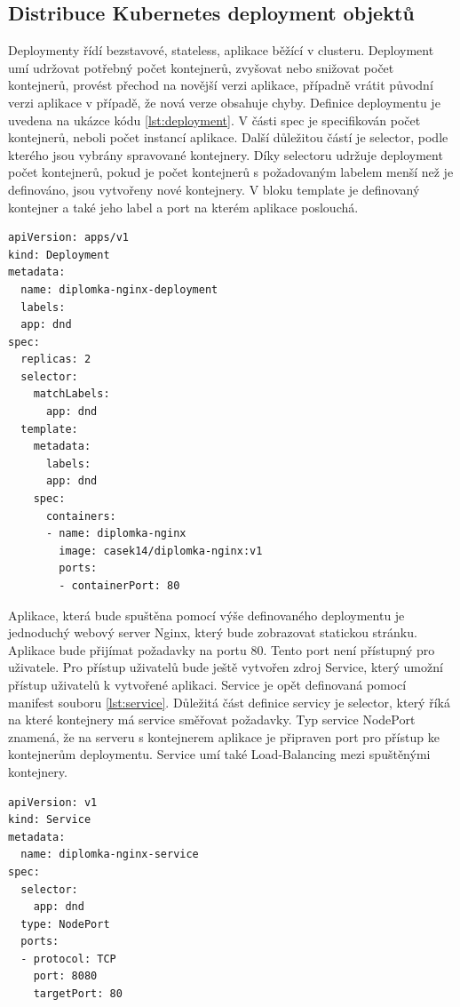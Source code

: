 \subsection{Distribuce Kubernetes deployment objektů}
Deploymenty řídí bezstavové, stateless, aplikace běžící v clusteru. Deployment umí udržovat potřebný počet kontejnerů, zvyšovat nebo snižovat počet kontejnerů, provést přechod na novější verzi aplikace, případně vrátit původní verzi aplikace v případě, že nová verze obsahuje chyby. Definice deploymentu je uvedena na ukázce kódu \ref{lst:deployment}. \linebreak V části spec je specifikován počet kontejnerů, neboli počet instancí aplikace. Další důležitou částí je selector, podle kterého jsou vybrány spravované kontejnery. Díky \linebreak selectoru udržuje deployment počet kontejnerů, pokud je počet kontejnerů s \linebreak požadovaným labelem menší než je definováno, jsou vytvořeny nové kontejnery. \linebreak V bloku template je definovaný kontejner a také jeho label a port na kterém aplikace poslouchá.
\begin{lstlisting}[caption={deployment.yml, definice deploymentu},label=lst:deployment]
apiVersion: apps/v1
kind: Deployment
metadata:
  name: diplomka-nginx-deployment
  labels:
  app: dnd
spec:
  replicas: 2
  selector:
    matchLabels:
      app: dnd
  template:
    metadata:
      labels:
      app: dnd
    spec:
      containers:
      - name: diplomka-nginx
        image: casek14/diplomka-nginx:v1
        ports:
        - containerPort: 80
\end{lstlisting}
													     Aplikace, která bude spuštěna pomocí výše definovaného deploymentu je jednoduchý webový server Nginx, který bude zobrazovat statickou stránku. Aplikace bude přijímat požadavky na portu 80. Tento port není přístupný pro uživatele. Pro přístup uživatelů bude ještě vytvořen zdroj Service, který umožní přístup uživatelů k vytvořené aplikaci. Service je opět definovaná pomocí manifest souboru \ref{lst:service}. Důležitá část definice servicy je selector, který říká na které kontejnery má service směřovat požadavky. Typ service NodePort znamená, že na serveru s kontejnerem aplikace je připraven port pro přístup ke kontejnerům deploymentu. Service umí také Load-Balancing mezi spuštěnými kontejnery. 
\begin{lstlisting}[caption={service.yml, definice service},label=lst:service]
apiVersion: v1
kind: Service
metadata:
  name: diplomka-nginx-service
spec:
  selector:
    app: dnd
  type: NodePort
  ports:
  - protocol: TCP
    port: 8080
    targetPort: 80
\end{lstlisting}

